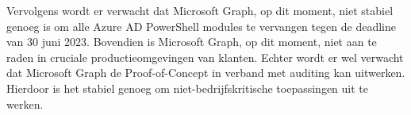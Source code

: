 Vervolgens wordt er verwacht dat Microsoft Graph, op dit moment, niet stabiel genoeg is om alle Azure AD PowerShell modules te vervangen tegen de deadline van 30 juni 2023. Bovendien is Microsoft Graph, op dit moment, niet aan te raden in cruciale productieomgevingen van klanten. Echter wordt er wel verwacht dat Microsoft Graph de Proof-of-Concept in verband met auditing kan uitwerken. Hierdoor is het stabiel genoeg om niet-bedrijfskritische toepassingen uit te werken.
